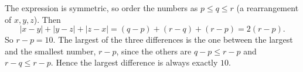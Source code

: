 The expression is symmetric, so order the numbers as $p\le q\le r$ (a rearrangement of $x,y,z$). Then
\[
|x-y|+|y-z|+|z-x|=(q-p)+(r-q)+(r-p)=2(r-p).
\]
So $r-p=10$. The largest of the three differences is the one between the largest and the smallest number, $r-p$, since the others are $q-p\le r-p$ and $r-q\le r-p$. Hence the largest difference is always exactly $\boxed{10}$.
